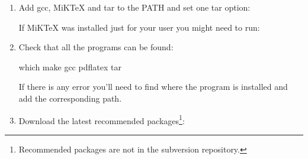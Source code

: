 \documentclass[
]{book}
\newenvironment{Shaded}{\begin{snugshade}}{\end{snugshade}}
\newcommand{\AttributeTok}[1]{\textcolor[rgb]{0.77,0.63,0.00}{#1}}
\newcommand{\BuiltInTok}[1]{#1}
\newcommand{\FunctionTok}[1]{\textcolor[rgb]{0.00,0.00,0.00}{#1}}
\newcommand{\NormalTok}[1]{#1}
\newcommand{\OperatorTok}[1]{\textcolor[rgb]{0.81,0.36,0.00}{\textbf{#1}}}
\newcommand{\StringTok}[1]{\textcolor[rgb]{0.31,0.60,0.02}{#1}}
\newcommand{\VariableTok}[1]{\textcolor[rgb]{0.00,0.00,0.00}{#1}}
\begin{document}
\begin{enumerate}
\begin{Shaded}
\end{Shaded}
\item
  Add gcc, MiKTeX and tar to the PATH and set one tar option:

\begin{Shaded}
\end{Shaded}

  If MiKTeX was installed just for your user you might need to run:

\begin{Shaded}
\end{Shaded}
\item
  Check that all the programs can be found:

\begin{Shaded}
\begin{Highlighting}[]
\FunctionTok{which}\NormalTok{ make gcc pdflatex tar}
\end{Highlighting}
\end{Shaded}

  If there is any error you'll need to find where the program is installed and add the corresponding path.
\item
  Download the latest recommended packages\footnote{Recommended packages are not in the subversion repository.}:


\end{enumerate}
\end{document}
